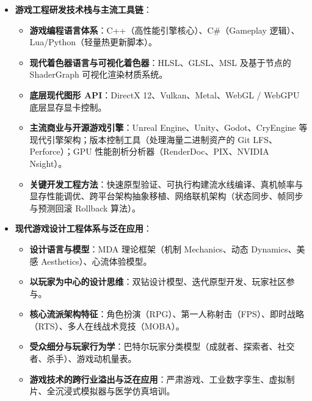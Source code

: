 \begin{itemize}
\begin{itemize}
        \item \textbf{核心算法、空间数据结构与数学模型}：确定性游戏主循环；空间加速层次树划分（八叉树 Octree、包围盒层次 BVH、KD-Tree）；视锥体裁剪与细节层次（LOD）动态调度；快速碰撞检测（分离轴定理 SAT、GJK 算法）与刚体碰撞响应；NPC 行为树与分层有限状态机（HFSM）；程序化内容生成（PCG）。
        \item \textbf{多媒体虚拟世界资产计算与表达}：空间多声道三维音频、精灵图集、3D 网格模型与物理基础材质（PBR 材质双向反射分布函数 BRDF）、骨骼动画与逆运动学插值。
    \end{itemize}
    \item \textbf{游戏工程研发技术栈与主流工具链}：
    \begin{itemize}
        \item \textbf{游戏编程语言体系}：C++（高性能引擎核心）、C\#（Gameplay 逻辑）、Lua/Python（轻量热更新脚本）。
        \item \textbf{现代着色器语言与可视化着色器}：HLSL、GLSL、MSL 及基于节点的 ShaderGraph 可视化渲染材质系统。
        \item \textbf{底层现代图形 API}：DirectX 12、Vulkan、Metal、WebGL / WebGPU 底层显存显卡控制。
        \item \textbf{主流商业与开源游戏引擎}：Unreal Engine、Unity、Godot、CryEngine 等现代引擎架构；版本控制工具（处理海量二进制资产的 Git LFS、Perforce）；GPU 性能剖析分析器（RenderDoc、PIX、NVIDIA Nsight）。
        \item \textbf{关键开发工程方法}：快速原型验证、可执行构建流水线编译、真机帧率与显存性能调优、跨平台架构抽象移植、网络联机架构（状态同步、帧同步与预测回滚 Rollback 算法）。
    \end{itemize}
    \item \textbf{现代游戏设计工程体系与泛在应用}：
    \begin{itemize}
        \item \textbf{设计语言与模型}：MDA 理论框架（机制 Mechanics、动态 Dynamics、美感 Aesthetics）、心流体验模型。
        \item \textbf{以玩家为中心的设计思维}：双钻设计模型、迭代原型开发、玩家社区参与。
        \item \textbf{核心流派架构特征}：角色扮演（RPG）、第一人称射击（FPS）、即时战略（RTS）、多人在线战术竞技（MOBA）。
        \item \textbf{受众细分与玩家行为学}：巴特尔玩家分类模型（成就者、探索者、社交者、杀手）、游戏动机量表。
        \item \textbf{游戏技术的跨行业溢出与泛在应用}：严肃游戏、工业数字孪生、虚拟制片、全沉浸式模拟器与医学仿真培训。
    \end{itemize}
\end{itemize}

